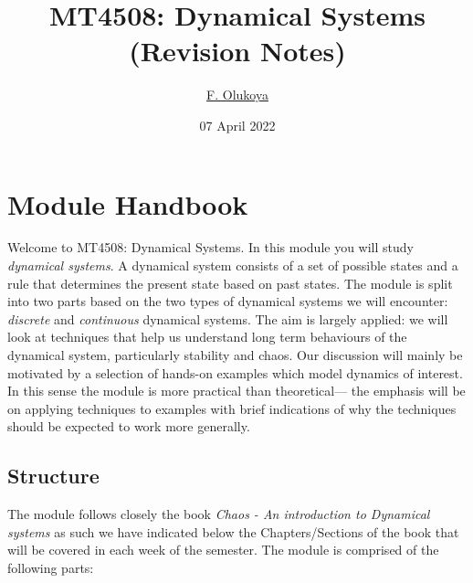\documentclass[
  a4paper,
  oneside,
  final]{krantz}
\title{MT4508: Dynamical Systems (Revision Notes)}
\author{\href{fo55@st-andrews.ac.uk}{F. Olukoya}}
\date{07 April 2022}
\theoremstyle{definition}
\theoremstyle{definition}
\theoremstyle{definition}
\theoremstyle{definition}
\theoremstyle{remark}
\begin{document}
\maketitle

{
\hypersetup{linkcolor=}
\setcounter{tocdepth}{2}
\tableofcontents
}
\hypertarget{Module-hand-book}{%
\chapter*{Module Handbook}\label{Module-hand-book}}


Welcome to MT4508: Dynamical Systems. In this module you will study \emph{dynamical systems}. A dynamical system consists of a set of possible states and a rule that determines the present state based on past states. The module is split into two parts based on the two types of dynamical systems we will encounter: \emph{discrete} and \emph{continuous} dynamical systems. The aim is largely applied: we will look at techniques that help us understand long term behaviours of the dynamical system, particularly stability and chaos. Our discussion will mainly be motivated by a selection of hands-on examples which model dynamics of interest. In this sense the module is more practical than theoretical--- the emphasis will be on applying techniques to examples with brief indications of why the techniques should be expected to work more generally.

\hypertarget{structure}{%
\section*{Structure}\label{structure}}


The module follows closely the book \emph{Chaos - An introduction to Dynamical systems} \citep{ASY} as such we have indicated below the Chapters/Sections of the book that will be covered in each week of the semester. The module is comprised of the following parts:
\end{document}
